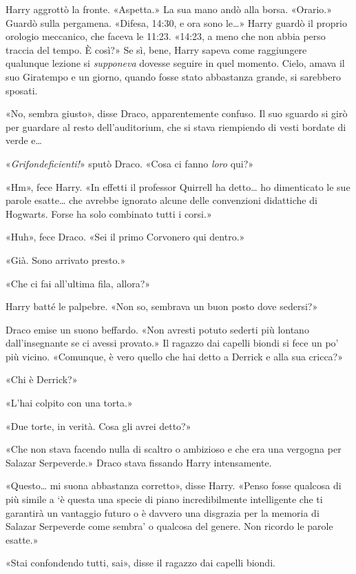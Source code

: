 Harry aggrottò la fronte. «Aspetta.» La sua mano andò alla borsa. «Orario.» Guardò sulla pergamena. «Difesa, 14:30, e ora sono le…» Harry guardò il proprio orologio meccanico, che faceva le 11:23. «14:23, a meno che non abbia perso traccia del tempo. È così?» Se sì, bene, Harry sapeva come raggiungere qualunque lezione si \textit{supponeva} dovesse seguire in quel momento. Cielo, amava il suo Giratempo e un giorno, quando fosse stato abbastanza grande, si sarebbero sposati.

«No, sembra giusto», disse Draco, apparentemente confuso. Il suo sguardo si girò per guardare al resto dell’auditorium, che si stava riempiendo di vesti bordate di verde e…

«\textit{Grifondeficienti!}» sputò Draco. «Cosa ci fanno \textit{loro} qui?»

«Hm», fece Harry. «In effetti il professor Quirrell ha detto… ho dimenticato le sue parole esatte… che avrebbe ignorato alcune delle convenzioni didattiche di Hogwarts. Forse ha solo combinato tutti i corsi.»

«Huh», fece Draco. «Sei il primo Corvonero qui dentro.»

«Già. Sono arrivato presto.»

«Che ci fai all’ultima fila, allora?»

Harry batté le palpebre. «Non so, sembrava un buon posto dove sedersi?»

Draco emise un suono beffardo. «Non avresti potuto sederti più lontano dall’insegnante se ci avessi provato.» Il ragazzo dai capelli biondi si fece un po’ più vicino. «Comunque, è vero quello che hai detto a Derrick e alla sua cricca?»

«Chi è Derrick?»

«L’hai colpito con una torta.»

«Due torte, in verità. Cosa gli avrei detto?»

«Che non stava facendo nulla di scaltro o ambizioso e che era una vergogna per Salazar Serpeverde.» Draco stava fissando Harry intensamente.

«Questo… mi suona abbastanza corretto», disse Harry. «Penso fosse qualcosa di più simile a ‘è questa una specie di piano incredibilmente intelligente che ti garantirà un vantaggio futuro o è davvero una disgrazia per la memoria di Salazar Serpeverde come sembra’ o qualcosa del genere. Non ricordo le parole esatte.»

«Stai confondendo tutti, sai», disse il ragazzo dai capelli biondi.

